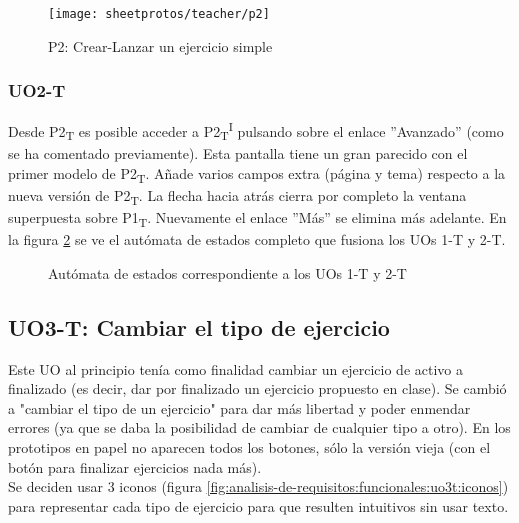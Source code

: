 \begin{figure}[!htbp]
	\centering
	\texttt{[image: sheetprotos/teacher/p2]}
	\caption{P2: Crear-Lanzar un ejercicio simple}
	\label{fig:analisis-de-requisitos:funcionales:uo1t:p2}
\end{figure}

\subsubsection{UO2-T}

Desde P2\textsubscript{T} es posible acceder a P2\textsubscript{T}\textsuperscript{I} pulsando sobre el enlace ''Avanzado'' (como se ha comentado previamente). Esta pantalla tiene un gran parecido con el primer modelo de P2\textsubscript{T}. Añade varios campos extra (página y tema) respecto a la nueva versión de P2\textsubscript{T}. La flecha hacia atrás cierra por completo la ventana superpuesta sobre P1\textsubscript{T}. Nuevamente el enlace ''Más'' se elimina más adelante. En la figura \ref{fig:analisis-de-requisitos:funcionales:uo1+2t:fsm} se ve el autómata de estados completo que fusiona los UOs 1-T y 2-T.\\

\noindent
\begin{figure}[!htbp]
\noindent
{}
\caption{Autómata de estados correspondiente a los UOs 1-T y 2-T}
\label{fig:analisis-de-requisitos:funcionales:uo1+2t:fsm}
\end{figure}

\subsection{UO3-T: Cambiar el tipo de ejercicio}
\label{analisis-de-requisitos:funcionales:uo3t}

Este UO al principio tenía como finalidad cambiar un ejercicio de activo a finalizado (es decir, dar por finalizado un ejercicio propuesto en clase). Se cambió a "cambiar el tipo de un ejercicio" para dar más libertad y poder enmendar errores (ya que se daba la posibilidad de cambiar de cualquier tipo a otro). En los prototipos en papel no aparecen todos los botones, sólo la versión vieja (con el botón para finalizar ejercicios nada más).\\

Se deciden usar 3 iconos (figura \ref{fig:analisis-de-requisitos:funcionales:uo3t:iconos}) para representar cada tipo de ejercicio para que resulten intuitivos sin usar texto.\\

